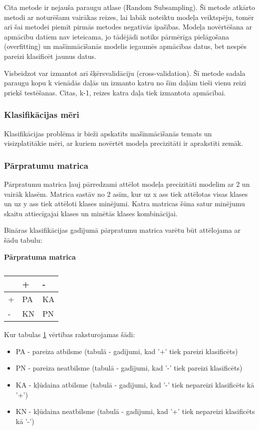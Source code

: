 Cita metode ir nejauša paraugu atlase (Random Subsampling). Šī metode atkārto metodi ar noturēšanu vairākas reizes, lai labāk noteiktu modeļa veiktspēju, tomēr arī šai metodei piemīt pirmās metodes negatīvās īpašības.
Modeļa novērtēšana ar apmācību datiem nav ieteicama, jo tādējādi notiks pārmērīga pielāgošana (overfitting) un mašīnmācīšanās modelis iegaumēs apmācības datus, bet nespēs pareizi klasificēt jaunus datus.

Visbeidzot var izmantot arī šķērsvalidāciju (cross-validation). Šī metode sadala paraugu kopu k vienādās daļās un izmanto katru no šīm daļām tieši vienu reizi priekš testēšanas.  Citas, k-1, reizes katra daļa tiek izmantota apmācībai.

\subsubsection{Klasifikācijas mēri}
\renewcommand{\theequation}{2.\arabic{equation}}
Klasifikācijas problēma ir bieži apskatīts mašīnmācīšanās temats un visizplatītākie mēri, ar kuriem novērtēt modeļa precizitāti ir aprakstīti zemāk.

\subsubsection{Pārpratumu matrica}
Pārpratumu matrica ļauj pārredzami attēlot modeļa precizitāti modelim ar 2 un vairāk klasēm. Matrica sastāv no 2 asīm, kur uz x ass tiek attēlotas visas klases un uz y ass tiek attēloti klases minējumi. Katra matricas šūna satur minējumu skaitu attiecīgajai klases un minētās klases kombinācijai.

Bināras klasifikācijas gadījumā pārpratumu matrica varētu būt attēlojama ar šādu tabulu:
\begin{table}[H]
\centering
\caption{\label{tab:novertejums}}
\textbf{Pārpratuma matrica\\}
\begin{tabular}{|l|l|l|}
\hline
  & +  & -  \\ \hline
+ & PA & KA \\ \hline
- & KN & PN \\ \hline
\end{tabular}
\end{table}

Kur tabulas  \ref{tab:novertejums} vērtības raksturojamas šādi:
\begin{itemize}
\item PA - pareiza atbilsme (tabulā - gadījumi, kad '+' tiek pareizi klasificēts)
\item PN - pareiza neatbilsme (tabulā - gadījumi, kad '-' tiek pareizi klasificēts)
\item KA - kļūdaina atbilsme (tabulā - gadījumi, kad '-' tiek nepareizi klasificēts kā '+')
\item KN - kļūdaina neatbilsme (tabulā - gadījumi, kad '+' tiek nepareizi klasificēts kā '-')

\end{itemize}
